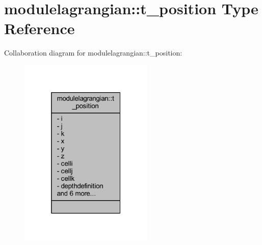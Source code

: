 \hypertarget{structmodulelagrangian_1_1t__position}{}\section{modulelagrangian\+:\+:t\+\_\+position Type Reference}
\label{structmodulelagrangian_1_1t__position}


Collaboration diagram for modulelagrangian\+:\+:t\+\_\+position\+:\nopagebreak
\begin{figure}[H]
\begin{center}
\leavevmode
\includegraphics[width=181pt]{structmodulelagrangian_1_1t__position__coll__graph}
\end{center}
\end{figure}
